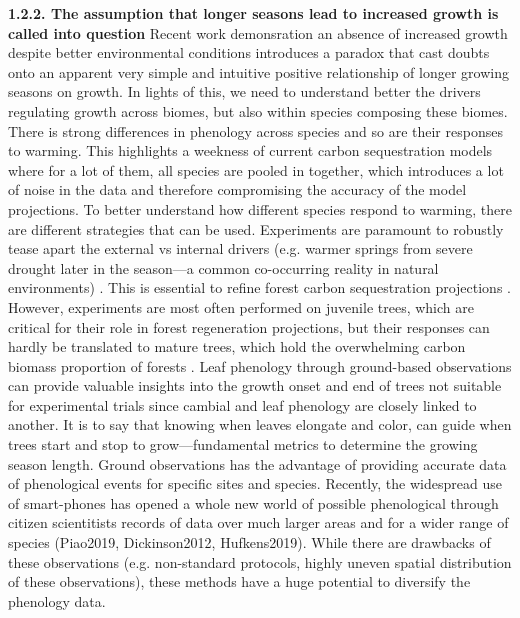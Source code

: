 \documentclass{article}
\begin{document}
\textbf{1.2.2. The assumption that longer seasons lead to increased growth is called into question}
Recent work demonsration an absence of increased growth despite better environmental conditions introduces a paradox that cast doubts onto an apparent very simple and intuitive positive relationship of longer growing seasons on growth. In lights of this, we need to understand better the drivers regulating growth across biomes, but also within species composing these biomes. There is strong differences in phenology across species and so are their responses to warming. This highlights a weekness of current carbon sequestration models where for a lot of them, all species are pooled in together, which introduces a lot of noise in the data and therefore compromising the accuracy of the model projections. To better understand how different species respond to warming, there are different strategies that can be used. Experiments are paramount to robustly tease apart the external vs internal drivers (e.g. warmer springs from severe drought later in the season---a common co-occurring reality in natural environments) \cite{morin_changes_2010,primack_observations_2015}. This is essential to refine forest carbon sequestration projections \cite{green_limits_2022,cabon_cross-biome_2022}. However, experiments are most often performed on juvenile trees, which are critical for their role in forest regeneration projections, but their responses can hardly be translated to mature trees, which hold the overwhelming carbon biomass proportion of forests \cite{augspurger_differences_2003,silvestro_longer_2023,vitasse_ontogenic_2013}. Leaf phenology through ground-based observations can provide valuable insights into the growth onset and end of trees not suitable for experimental trials since cambial and leaf phenology are closely linked to another. It is to say that knowing when leaves elongate and color, can guide when trees start and stop to grow---fundamental metrics to determine the growing season length. Ground observations has the advantage of providing accurate data of phenological events for specific sites and species. Recently, the widespread use of smart-phones has opened a whole new world of possible phenological through citizen scientitists records of data over much larger areas and for a wider range of species (Piao2019, Dickinson2012, Hufkens2019). While there are drawbacks of these observations (e.g. non-standard protocols, highly uneven spatial distribution of these observations), these methods have a huge potential to diversify the phenology data. %
\end{document}
